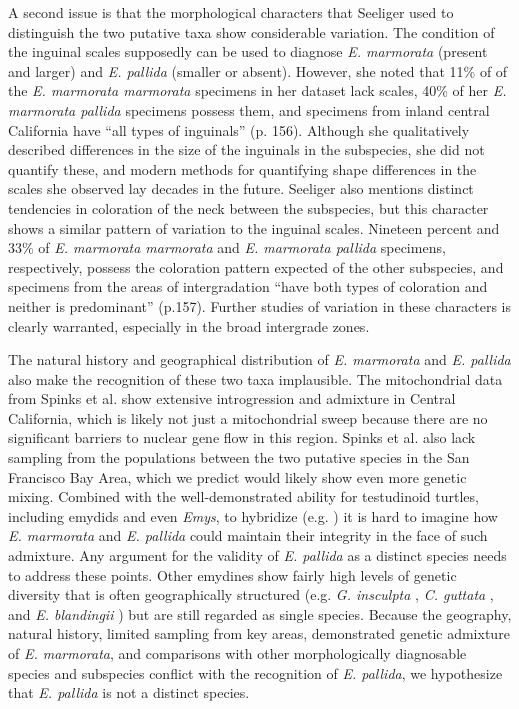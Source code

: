 \documentclass[10pt,letterpaper]{article}
\begin{document}
A second issue is that the morphological characters that Seeliger \cite{Seeliger1945} used to distinguish the two putative taxa show considerable variation. The condition of the inguinal scales supposedly can be used to diagnose \textit{E. marmorata} (present and larger) and \textit{E. pallida} (smaller or absent). However, she noted that 11\% of of the \textit{E. marmorata marmorata} specimens in her dataset lack scales, 40\% of her \textit{E. marmorata pallida} specimens possess them, and specimens from inland central California have “all types of inguinals” (p. 156). Although she qualitatively described differences in the size of the inguinals in the subspecies, she did not quantify these, and modern methods for quantifying shape differences in the scales she observed lay decades in the future. Seeliger \cite{Seeliger1945} also mentions distinct tendencies in coloration of the neck between the subspecies, but this character shows a similar pattern of variation to the inguinal scales. Nineteen percent and 33\% of \textit{E. marmorata marmorata} and \textit{E. marmorata pallida} specimens, respectively, possess the coloration pattern expected of the other subspecies, and specimens from the areas of intergradation “have both types of coloration and neither is predominant” (p.157). Further studies of variation in these characters is clearly warranted, especially in the broad intergrade zones.

The natural history and geographical distribution of \textit{E. marmorata} and \textit{E. pallida} also make the recognition of these two taxa implausible. The mitochondrial data from Spinks et al. \cite{Spinks2014} show extensive introgression and admixture in Central California, which is likely not just a mitochondrial sweep because there are no significant barriers to nuclear gene flow in this region. Spinks et al. also lack sampling from the populations between the two putative species in the San Francisco Bay Area, which we predict would likely show even more genetic mixing. Combined with the well-demonstrated ability for testudinoid turtles, including emydids and even \textit{Emys}, to hybridize (e.g. \cite{Buskirk2005,Spinks2009,Parham2013}) it is hard to imagine how \textit{E. marmorata} and \textit{E. pallida} could maintain their integrity in the face of such admixture. Any argument for the validity of \textit{E. pallida} as a distinct species needs to address these points. Other emydines show fairly high levels of genetic diversity that is often geographically structured (e.g. \textit{G. insculpta} \cite{Amato2008}, \textit{C. guttata} \cite{Davy2014}, and \textit{E. blandingii} \cite{Sethuraman2014}) but are still regarded as single species. Because the geography, natural history, limited sampling from key areas, demonstrated genetic admixture of \textit{E. marmorata}, and comparisons with other morphologically diagnosable species and subspecies conflict with the recognition of \textit{E. pallida}, we hypothesize that \textit{E. pallida} is not a distinct species. 
\end{document}
